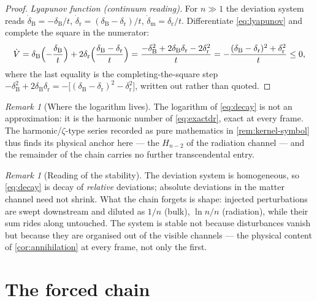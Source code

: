 \documentclass[11pt]{amsbook}
\theoremstyle{plain}
\theoremstyle{definition}
\theoremstyle{remark}
\newtheorem{remark}[theorem]{Remark}
\begin{document}
\begin{proof}
\emph{Lyapunov function (continuum reading).} For $n \gg 1$ the deviation system reads $\dot\delta_{\mathrm B} = -\delta_{\mathrm B}/t$, $\dot\delta_{\mathrm r} = (\delta_{\mathrm B} - \delta_{\mathrm r})/t$, $\dot\delta_{\mathrm m} = \delta_{\mathrm r}/t$. Differentiate \cref{eq:lyapunov} and complete the square in the numerator:
\begin{equation}\label{eq:vdot}
\dot V = \delta_{\mathrm B}\Bigl(-\frac{\delta_{\mathrm B}}{t}\Bigr) + 2\delta_{\mathrm r}\Bigl(\frac{\delta_{\mathrm B} - \delta_{\mathrm r}}{t}\Bigr)
= \frac{-\delta_{\mathrm B}^{2} + 2\delta_{\mathrm B}\delta_{\mathrm r} - 2\delta_{\mathrm r}^{2}}{t}
= -\frac{(\delta_{\mathrm B} - \delta_{\mathrm r})^{2} + \delta_{\mathrm r}^{2}}{t} \leq 0,
\end{equation}
where the last equality is the completing-the-square step $-\delta_{\mathrm B}^{2} + 2\delta_{\mathrm B}\delta_{\mathrm r} = -\bigl[(\delta_{\mathrm B}-\delta_{\mathrm r})^{2} - \delta_{\mathrm r}^{2}\bigr]$, written out rather than quoted.
\end{proof}

\begin{remark}[Where the logarithm lives]\label{rem:harmonic-anchor}
The logarithm of \cref{eq:decay} is not an approximation: it is the harmonic number of \cref{eq:exactdr}, exact at every frame. The harmonic/$\zeta$-type series recorded as pure mathematics in \cref{rem:kernel-symbol} thus finds its physical anchor here --- the $H_{n-2}$ of the radiation channel --- and the remainder of the chain carries no further transcendental entry.
\end{remark}

\begin{remark}[Reading of the stability]\label{rem:stability-reading}
The deviation system is homogeneous, so \cref{eq:decay} is decay of \emph{relative} deviations; absolute deviations in the matter channel need not shrink. What the chain forgets is shape: injected perturbations are swept downstream and diluted as $1/n$ (bulk), $\ln n/n$ (radiation), while their sum rides along untouched. The system is stable not because disturbances vanish but because they are organised out of the visible channels --- the physical content of \cref{cor:annihilation} at every frame, not only the first.
\end{remark}

\section{The forced chain}\label{sec:forced-cascade}
\end{document}
